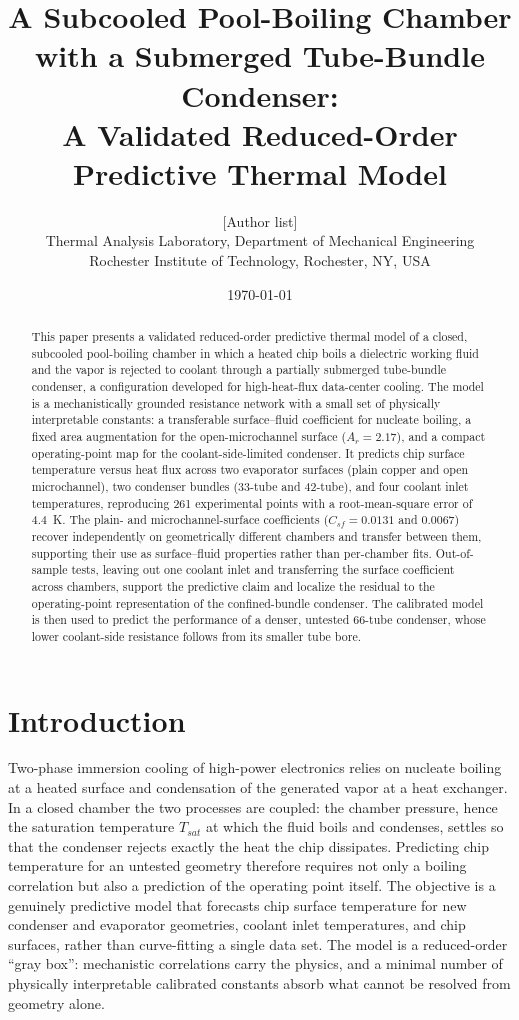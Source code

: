 \documentclass[11pt]{article}
\title{\textbf{A Subcooled Pool-Boiling Chamber with a Submerged Tube-Bundle Condenser:\\
A Validated Reduced-Order Predictive Thermal Model}}
\author{[Author list]\\
\small Thermal Analysis Laboratory, Department of Mechanical Engineering\\
\small Rochester Institute of Technology, Rochester, NY, USA}
\date{\today}
\begin{document}
\maketitle

\begin{abstract}
\noindent
This paper presents a validated reduced-order predictive thermal model of a closed, subcooled
pool-boiling chamber in which a heated chip boils a dielectric working fluid and the vapor is
rejected to coolant through a partially submerged tube-bundle condenser, a configuration
developed for high-heat-flux data-center cooling. The model is a mechanistically grounded
resistance network with a small set of physically interpretable constants: a transferable
surface--fluid coefficient for nucleate boiling, a fixed area augmentation for the
open-microchannel surface ($A_r=2.17$), and a compact operating-point map for the
coolant-side-limited condenser. It predicts chip surface temperature versus heat flux across two
evaporator surfaces (plain copper and open microchannel), two condenser bundles (33-tube and
42-tube), and four coolant inlet temperatures, reproducing 261 experimental points with a
root-mean-square error of \SI{4.4}{K}. The plain- and microchannel-surface coefficients
($C_{sf}=0.0131$ and $0.0067$) recover independently on geometrically different chambers and
transfer between them, supporting their use as surface--fluid properties rather than per-chamber
fits. Out-of-sample tests, leaving out one coolant inlet and transferring the surface coefficient
across chambers, support the predictive claim and localize the residual to the operating-point
representation of the confined-bundle condenser. The calibrated model is then used to predict the
performance of a denser, untested 66-tube condenser, whose lower coolant-side resistance follows
from its smaller tube bore.
\end{abstract}

\section{Introduction}
Two-phase immersion cooling of high-power electronics relies on nucleate boiling at a
heated surface and condensation of the generated vapor at a heat exchanger. In a closed
chamber the two processes are coupled: the chamber pressure, hence the saturation
temperature $T_{sat}$ at which the fluid boils and condenses, settles so that the
condenser rejects exactly the heat the chip dissipates. Predicting chip temperature for
an untested geometry therefore requires not only a boiling correlation but also a
prediction of the operating point itself. The objective is a genuinely predictive model
that forecasts chip surface temperature for new condenser and evaporator geometries,
coolant inlet temperatures, and chip surfaces, rather than curve-fitting a single data
set. The model is a reduced-order ``gray box'': mechanistic correlations carry the
physics, and a minimal number of physically interpretable calibrated constants absorb
what cannot be resolved from geometry alone.
\end{document}
